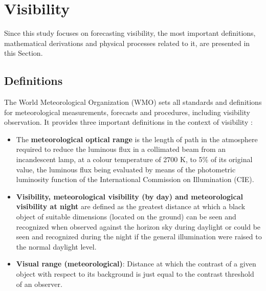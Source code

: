 \section{Visibility}
\label{sec:visib}
Since this study focuses on forecasting visibility, the most important definitions, mathematical derivations and physical processes related to it, are presented in this Section.
\subsection{Definitions}
The World Meteorological Organization (WMO) sets all standards and definitions for meteorological measurements, forecasts and procedures, including visibility observation. It  provides three important definitions in the context of visibility \cite{WMO}:
\begin{itemize}
    \item {The \textbf{meteorological optical range} is the length of path in the atmosphere required to reduce the luminous flux in a collimated beam from an incandescent lamp, at a colour temperature of 2700 K, to 5\% of its original value, the luminous flux being evaluated by means of the photometric luminosity function of the International Commission on Illumination (CIE). }
    \item{ \textbf{Visibility, meteorological visibility (by day) and meteorological visibility at night} are defined as the greatest distance at which a black object of suitable dimensions (located on the ground) can be seen and recognized when observed against the horizon sky during daylight or could be seen and recognized during the night if the general illumination were raised to the normal daylight level.}
    \item { \textbf{Visual range (meteorological)}: Distance at which the contrast of a given object with respect to its background is just equal to the contrast threshold of an observer.}
\end{itemize}



